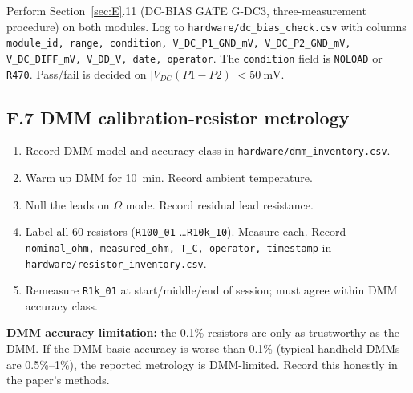 \documentclass[11pt,a4paper]{article}
\begin{document}
Perform Section~\ref{sec:E}.11 (DC-BIAS GATE G-DC3, three-measurement procedure) on both modules. Log to \texttt{hardware/dc\_bias\_check.csv} with columns \texttt{module\_id, range, condition, V\_DC\_P1\_GND\_mV, V\_DC\_P2\_GND\_mV, V\_DC\_DIFF\_mV, V\_DD\_V, date, operator}. The \texttt{condition} field is \texttt{NOLOAD} or \texttt{R470}. Pass/fail is decided on $|V_{DC}(P1\!-\!P2)| < \SI{50}{\milli\volt}$.

\subsection{F.7 DMM calibration-resistor metrology}

\begin{enumerate}
\item Record DMM model and accuracy class in \texttt{hardware/dmm\_inventory.csv}.
\item Warm up DMM for 10~min. Record ambient temperature.
\item Null the leads on $\Omega$ mode. Record residual lead resistance.
\item Label all 60 resistors (\texttt{R100\_01} \ldots \texttt{R10k\_10}). Measure each. Record \texttt{nominal\_ohm, measured\_ohm, T\_C, operator, timestamp} in \texttt{hardware/resistor\_inventory.csv}.
\item Remeasure \texttt{R1k\_01} at start/middle/end of session; must agree within DMM accuracy class.
\end{enumerate}

\begin{openbox}
\textbf{DMM accuracy limitation:} the 0.1\% resistors are only as trustworthy as the DMM. If the DMM basic accuracy is worse than 0.1\% (typical handheld DMMs are 0.5\%--1\%), the reported metrology is DMM-limited. Record this honestly in the paper's methods.
\end{openbox}
\end{document}
